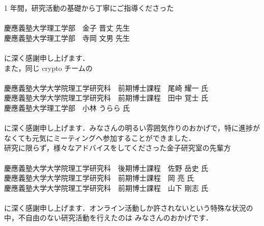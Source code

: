 

{\small
1 年間，研究活動の基礎から丁寧にご指導くださった\\
\\
\hspace{1cm}慶應義塾大学理工学部　金子 晋丈 先生\\
\hspace{1cm}慶應義塾大学理工学部　寺岡 文男 先生\\
\\
に深く感謝申し上げます．\\

また，同じ crypto チームの\\
\\
\hspace{1cm}慶應義塾大学大学院理工学研究科　前期博士課程　尾崎 耀一 氏\\
\hspace{1cm}慶應義塾大学大学院理工学研究科　前期博士課程　田中 覚士 氏\\
\hspace{1cm}慶應義塾大学理工学部　小林 うらら 氏\\
\\
に深く感謝申し上げます．みなさんの明るい雰囲気作りのおかげで，特に進捗がなくても元気にミーティングへ参加することができました．\\

研究に限らず，様々なアドバイスをしてくださった金子研究室の先輩方\\
\\
\hspace{1cm}慶應義塾大学大学院理工学研究科　後期博士課程　佐野 岳史 氏\\
\hspace{1cm}慶應義塾大学大学院理工学研究科　前期博士課程　岡 亮 氏\\
\hspace{1cm}慶應義塾大学大学院理工学研究科　前期博士課程　山下 剛志 氏\\
\\
に深く感謝申し上げます．オンライン活動しか許されないという特殊な状況の中，不自由のない研究活動を行えたのは
みなさんのおかげです．\\

}
